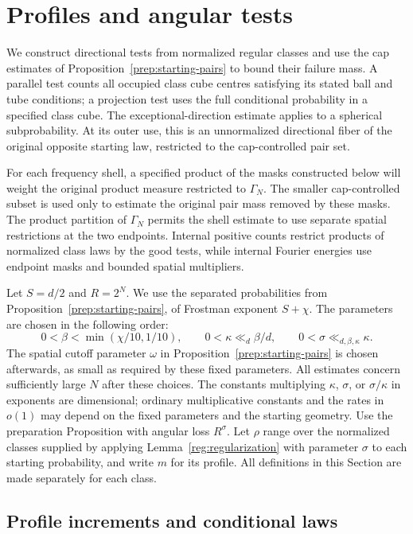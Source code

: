 \section{Profiles and angular tests}\label{test:section}

We construct directional tests from normalized regular classes and use
the cap estimates of Proposition~\ref{prep:starting-pairs} to bound their
failure mass. A parallel test counts all occupied class cube centres
satisfying its stated ball and tube conditions; a projection test uses
the full conditional probability in a specified class cube. The
exceptional-direction estimate applies to a spherical subprobability.
At its outer use, this is an unnormalized directional fiber of the
original opposite starting law, restricted to the cap-controlled pair set.

For each frequency shell, a specified product of the masks constructed
below will weight the original product measure restricted to $\Gamma_N$.
The smaller cap-controlled subset is used only to estimate the original
pair mass removed by these masks. The product partition of $\Gamma_N$
permits the shell estimate to use separate spatial restrictions at the
two endpoints. Internal positive counts restrict products of normalized
class laws by the good tests, while internal Fourier energies use endpoint
masks and bounded spatial multipliers.

Let $S=d/2$ and $R=2^N$. We use the separated probabilities from
Proposition~\ref{prep:starting-pairs}, of Frostman exponent $S+\chi$.
The parameters are chosen in the following order:
\[
0<\beta<\min(\chi/10,1/10),\qquad
0<\kappa\ll_d\beta/d,\qquad
0<\sigma\ll_{d,\beta,\kappa}\kappa.
\]
The spatial cutoff parameter $\omega$ in
Proposition~\ref{prep:starting-pairs} is chosen afterwards, as small as
required by these fixed parameters. All estimates concern
sufficiently large $N$ after these choices. The constants multiplying
$\kappa$, $\sigma$, or $\sigma/\kappa$ in exponents are dimensional;
ordinary multiplicative constants and the rates in $o(1)$ may depend
on the fixed parameters and the starting geometry. Use the preparation
Proposition with angular loss $R^\sigma$. Let $\rho$ range over the
normalized classes supplied by applying Lemma~\ref{reg:regularization}
with parameter $\sigma$ to each starting probability, and write $m$ for
its profile. All definitions in this Section are made separately for each
class.

\subsection{Profile increments and conditional laws}

